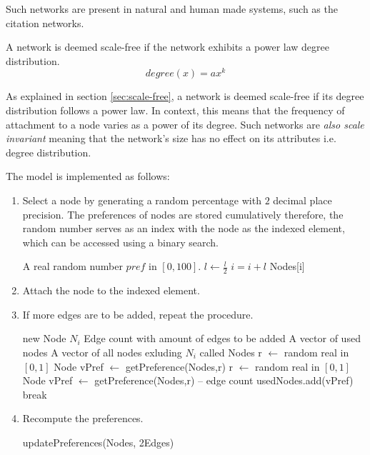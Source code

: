 \documentclass[a4paper,11pt,titlepage]{article}
\begin{document}
Such networks are present in natural and human made systems, such as the
citation networks.

A network is deemed scale-free if the network exhibits a power law degree
distribution.
\[
degree(x) = ax^k
 \]

As explained in section \ref{sec:scale-free}, a network is deemed scale-free if
its degree distribution follows a power law.  In context, this means that the
frequency of attachment to a node varies as a power of its degree. Such networks
are \emph{also scale invariant} meaning that the network's size has no effect on
its attributes i.e. degree distribution.

The model is implemented as follows:
\begin{enumerate}
\item
  Select a node by generating a random percentage with $2$ decimal place
  precision.  The preferences of nodes are stored cumulatively therefore, the
  random number serves as an index with the node as the indexed element, which
  can be accessed using a binary search.
  \begin{algorithmic}
    \REQUIRE A real random number $pref$ in $[0,100]$.
	      \STATE $l \gets \frac{l}{2}$
		\STATE $i = i+l$
		\ENDIF
	\ENDIF
	\ENDFOR
\ENDFOR
\RETURN Nodes[i]
\end{algorithmic}
  \item Attach the node to the indexed element.
  \item If more edges are to be added, repeat the procedure.

\begin{algorithmic}
\REQUIRE  new Node $N_i$
\REQUIRE Edge count with amount of edges to be added
\REQUIRE A vector of used nodes
\REQUIRE A vector of all nodes exluding $N_i$ called Nodes
	\STATE r $\gets$ random real in $[0, 1]$
	\STATE Node vPref $\gets$ getPreference(Nodes,r)
		\STATE r $\gets$ random real in $[0, 1]$
		\STATE Node vPref $\gets$ getPreference(Nodes,r)
	\ENDWHILE
	\STATE -- edge count
	\STATE usedNodes.add(vPref)
		\STATE break
	\ENDIF
\ENDWHILE

\end{algorithmic}
  \item Recompute the preferences.
\begin{algorithmic}
	\STATE updatePreferences(Nodes, 2Edges)
\end{algorithmic}
\end{enumerate}
\end{document}
